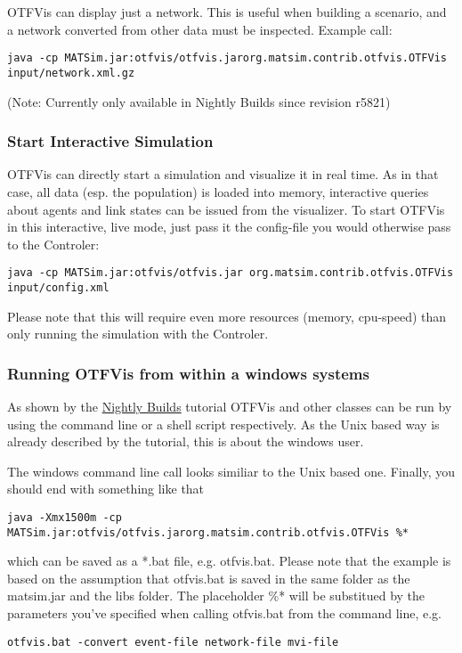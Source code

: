 OTFVis can display just a network. This is useful when building a  scenario, and a network converted from other data must be inspected.  Example call:
\begin{verbatim}
java -cp MATSim.jar:otfvis/otfvis.jarorg.matsim.contrib.otfvis.OTFVis input/network.xml.gz
\end{verbatim}

(Note: Currently only available in Nightly Builds since revision r5821)

\subsubsection{Start Interactive Simulation}

OTFVis can directly start a simulation and visualize it in real time.  As in that case, all data (esp. the population) is loaded into memory,  interactive queries about agents and link states can be issued from the  visualizer. To start OTFVis in this interactive, live mode, just pass it  the config-file you would otherwise pass to the Controler:
\begin{verbatim}
java -cp MATSim.jar:otfvis/otfvis.jar org.matsim.contrib.otfvis.OTFVis input/config.xml
\end{verbatim}

Please note that this will require even more resources (memory, cpu-speed) than only running the simulation with the Controler.

\subsubsection{Running OTFVis from within a windows systems}

As shown by the \href{http://www.matsim.org/downloads/nightly}{Nightly Builds}  tutorial OTFVis and other classes can be run by using the command line  or a shell script respectively. As the Unix based way is already  described by the tutorial, this is about the windows user.

The windows command line call looks similiar to the Unix based one. Finally, you should end with something like that
\begin{verbatim}
java -Xmx1500m -cp MATSim.jar:otfvis/otfvis.jarorg.matsim.contrib.otfvis.OTFVis %*
\end{verbatim}

which can be saved as a *.bat file, e.g. otfvis.bat. Please note that  the example is based on the assumption that otfvis.bat is saved in the  same folder as the matsim.jar and the libs folder. The placeholder \%*  will be substitued by the parameters you've specified when calling  otfvis.bat from the command line, e.g.
\begin{verbatim}
otfvis.bat -convert event-file network-file mvi-file
\end{verbatim}

